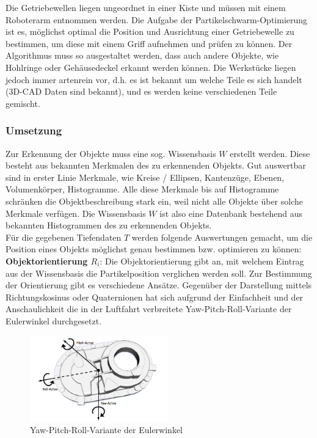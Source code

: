 Die Getriebewellen liegen ungeordnet in einer Kiste und müssen mit einem Roboterarm entnommen werden. Die Aufgabe der Partikelschwarm-Optimierung ist es, möglichst optimal die Position und Ausrichtung einer Getriebewelle zu bestimmen, um diese mit einem Griff aufnehmen und prüfen zu können.
Der Algorithmus muss so ausgestaltet werden, dass auch andere Objekte, wie Hohlringe oder Gehäusedeckel erkannt werden können. Die Werkstücke liegen jedoch immer artenrein vor, d.h. es ist bekannt um welche Teile es sich handelt (3D-CAD Daten sind bekannt), und es werden keine verschiedenen Teile gemischt.

\subsubsection{Umsetzung}
Zur Erkennung der Objekte muss eine sog. Wissensbasis $W$ erstellt werden. Diese besteht aus bekannten Merkmalen des zu erkennenden Objekts. Gut auswertbar sind in erster Linie Merkmale, wie Kreise / Ellipsen, Kantenzüge, Ebenen, Volumenkörper, Histogramme. Alle diese Merkmale bis auf Histogramme schränken die Objektbeschreibung stark ein, weil nicht alle Objekte über solche Merkmale verfügen. Die Wissensbasis $W$ ist also eine Datenbank bestehend aus bekannten Histogrammen des zu erkennenden Objekts. \\

Für die gegebenen Tiefendaten $T$ werden folgende Auswertungen gemacht, um die Position eines Objekts möglichst genau bestimmen bzw. optimieren zu können:  \\

\textbf{Objektorientierung $R_i$}: Die Objektorientierung gibt an, mit welchem Eintrag aus der Wissensbasis die Partikelposition verglichen werden soll. Zur Bestimmung der Orientierung gibt es verschiedene Ansätze. Gegenüber der Darstellung mittels Richtungskosinus oder Quaternionen hat sich aufgrund der Einfachheit und der Anschaulichkeit die in der Luftfahrt verbreitete Yaw-Pitch-Roll-Variante der Eulerwinkel durchgesetzt.

\begin{figure}[htbp]
	\centering
	\includegraphics[width=6cm]{images/yaw-pitch-roll}
	\caption{Yaw-Pitch-Roll-Variante der Eulerwinkel}
	\label{Fig-Yaw-Pitch-Roll}
\end{figure}

